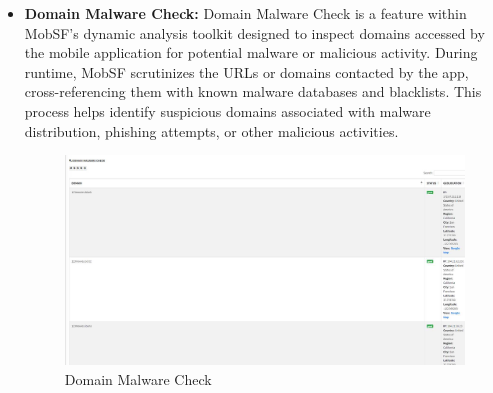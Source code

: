 \documentclass{report}
\begin{document}
\begin{itemize}
    \item \textbf {Domain Malware Check: }
    Domain Malware Check is a feature within MobSF's dynamic analysis toolkit designed to inspect domains accessed by the mobile application for potential malware or malicious activity. During runtime, MobSF scrutinizes the URLs or domains contacted by the app, cross-referencing them with known malware databases and blacklists. This process helps identify suspicious domains associated with malware distribution, phishing attempts, or other malicious activities.
    \begin{figure}[hbt!]
    \centering
    \includegraphics[width=1\linewidth]{Dynamic Analyzer/domain_mal_rep.jpg}
    \caption{Domain Malware Check}
    \label{fig:example}
    \end{figure}
    \FloatBarrier

    
\end{itemize}
\end{document}
